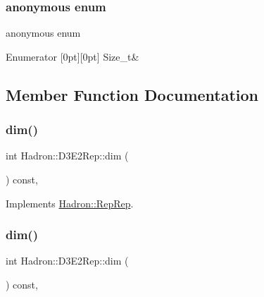 \subsubsection{\texorpdfstring{anonymous enum}{anonymous enum}}
{\footnotesize\ttfamily anonymous enum}

\begin{DoxyEnumFields}{Enumerator}
[0pt][0pt]{}\mbox{\label{structHadron_1_1D3E2Rep_aec6f0f06ffc02ab3edc140db2a698fc6a2f1b559918156159e495ee08a367bb08}} 
Size\+\_\+t&\\
\hline

\end{DoxyEnumFields}


\subsection{Member Function Documentation}
\mbox{\label{structHadron_1_1D3E2Rep_a79f191ce59b4b506979041561fd3efd1}} 
\subsubsection{\texorpdfstring{dim()}{dim()}\hspace{0.1cm}{\footnotesize\ttfamily [1/5]}}
{\footnotesize\ttfamily int Hadron\+::\+D3\+E2\+Rep\+::dim (\begin{DoxyParamCaption}{ }\end{DoxyParamCaption}) const\hspace{0.3cm}{\ttfamily [inline]}, {\ttfamily [virtual]}}



Implements \mbox{\hyperlink{structHadron_1_1RepRep_a92c8802e5ed7afd7da43ccfd5b7cd92b}{Hadron\+::\+Rep\+Rep}}.

\mbox{\label{structHadron_1_1D3E2Rep_a79f191ce59b4b506979041561fd3efd1}} 
\subsubsection{\texorpdfstring{dim()}{dim()}\hspace{0.1cm}{\footnotesize\ttfamily [2/5]}}
{\footnotesize\ttfamily int Hadron\+::\+D3\+E2\+Rep\+::dim (\begin{DoxyParamCaption}{ }\end{DoxyParamCaption}) const\hspace{0.3cm}{\ttfamily [inline]}, {\ttfamily [virtual]}}



